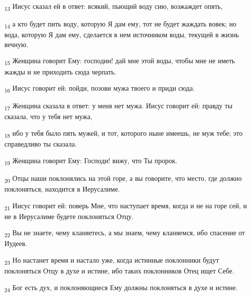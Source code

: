 \begin{tcolorbox}
\textsubscript{13} Иисус сказал ей в ответ: всякий, пьющий воду сию, возжаждет опять,
\end{tcolorbox}
\begin{tcolorbox}
\textsubscript{14} а кто будет пить воду, которую Я дам ему, тот не будет жаждать вовек; но вода, которую Я дам ему, сделается в нем источником воды, текущей в жизнь вечную.
\end{tcolorbox}
\begin{tcolorbox}
\textsubscript{15} Женщина говорит Ему: господин! дай мне этой воды, чтобы мне не иметь жажды и не приходить сюда черпать.
\end{tcolorbox}
\begin{tcolorbox}
\textsubscript{16} Иисус говорит ей: пойди, позови мужа твоего и приди сюда.
\end{tcolorbox}
\begin{tcolorbox}
\textsubscript{17} Женщина сказала в ответ: у меня нет мужа. Иисус говорит ей: правду ты сказала, что у тебя нет мужа,
\end{tcolorbox}
\begin{tcolorbox}
\textsubscript{18} ибо у тебя было пять мужей, и тот, которого ныне имеешь, не муж тебе; это справедливо ты сказала.
\end{tcolorbox}
\begin{tcolorbox}
\textsubscript{19} Женщина говорит Ему: Господи! вижу, что Ты пророк.
\end{tcolorbox}
\begin{tcolorbox}
\textsubscript{20} Отцы наши поклонялись на этой горе, а вы говорите, что место, где должно поклоняться, находится в Иерусалиме.
\end{tcolorbox}
\begin{tcolorbox}
\textsubscript{21} Иисус говорит ей: поверь Мне, что наступает время, когда и не на горе сей, и не в Иерусалиме будете поклоняться Отцу.
\end{tcolorbox}
\begin{tcolorbox}
\textsubscript{22} Вы не знаете, чему кланяетесь, а мы знаем, чему кланяемся, ибо спасение от Иудеев.
\end{tcolorbox}
\begin{tcolorbox}
\textsubscript{23} Но настанет время и настало уже, когда истинные поклонники будут поклоняться Отцу в духе и истине, ибо таких поклонников Отец ищет Себе.
\end{tcolorbox}
\begin{tcolorbox}
\textsubscript{24} Бог есть дух, и поклоняющиеся Ему должны поклоняться в духе и истине.
\end{tcolorbox}

